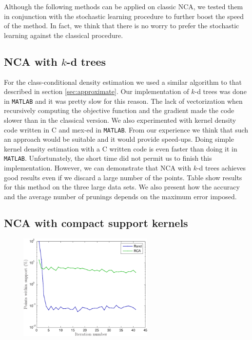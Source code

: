 Although the following methods can be applied on classic NCA, we tested them in conjunction with the stochastic learning procedure to further boost the speed of the method. In fact, we think that there is no worry to prefer the stochastic learning against the classical procedure.

\subsection{NCA with $k$-d trees}
\label{subsec:eval-nca-k-d-trees}

For the class-conditional density estimation we used a similar algorithm to that described in section \ref{sec:approximate}. Our implementation of $k$-d trees was done in \texttt{MATLAB} and it was pretty slow for this reason. The lack of vectorization when recursively computing the objective function and the gradient made the code slower than in the classical version. We also experimented with kernel density code written in C and mex-ed in \texttt{MATLAB}. From our experience we think that such an approach would be suitable and it would provide speed-ups. Doing simple kernel density estimation with a C written code is even faster than doing it in \texttt{MATLAB}. Unfortunately, the short time did not permit us to finish this implementation. However, we can demonstrate that  NCA with $k$-d trees achieves good results even if we discard a large number of the points. Table show results for this method on the three large data sets. We also present how the accuracy and the average number of prunings depends on the maximum error imposed. 

\subsection{NCA with compact support kernels}
\label{subsec:eval-nca-cs}

\begin{figure}
	\centering
	\includegraphics[width=0.6\textwidth]{images/nca-cs-nnzs}
\end{figure}


